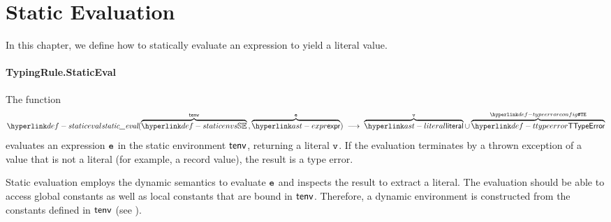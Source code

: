 \chapter{Static Evaluation\label{chap:staticevaluation}}

In this chapter, we define how to statically evaluate an expression
to yield a literal value.

\hypertarget{def-staticeval}{}
\subsubsection{TypingRule.StaticEval\label{sec:TypingRule.StaticEval}}
The function
\[
  \staticeval(\overname{\staticenvs}{\tenv} \aslsep \overname{\expr}{\ve}) \;\aslto\;
  \overname{\literal}{\vv} \cup
  \overname{\TTypeError}{\TypeErrorConfig}
\]
evaluates an expression $\texttt{e}$
in the static environment $\textsf{tenv}$, returning a literal $\texttt{v}$.
If the evaluation terminates by a thrown exception of a value that is not a literal
(for example, a record value), the result is a type error.

Static evaluation employs the dynamic semantics to evaluate $\texttt{e}$ and inspects the result to extract
a literal. The evaluation should be able to access global constants as well as local constants that
are bound in $\textsf{tenv}$. Therefore, a dynamic environment is constructed from the constants defined in $\textsf{tenv}$
(see ).

